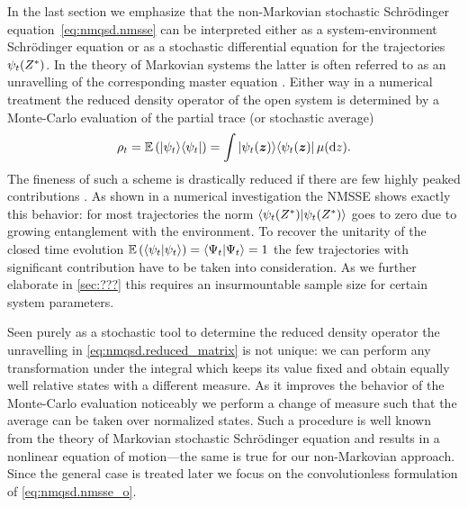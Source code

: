 In the last section we emphasize that the non-Markovian stochastic Schrödinger equation~\ref{eq:nmqsd.nmsse} can be interpreted either as a system-environment Schrödinger equation or as a stochastic differential equation for the trajectories $\psi_t({Z}^*)$.
In the theory of Markovian systems the latter is often referred to as an unravelling of the corresponding master equation \cite{???}.
Either way in a numerical treatment the reduced density operator of the open system is determined by a Monte-Carlo evaluation of the partial trace (or stochastic average)
\begin{equation}
  \rho_t = \E[\ket{\psi_t}\bra{\psi_t}] = \int \ket{\psi_t(\zz)}\bra{\psi_t(\zz)} \mudz.
  \label{eq:nmqsd.reduced_matrix}
\end{equation}
The fineness of such a scheme is drastically reduced if there are few highly peaked contributions \cite{DuSh11_monte_carlo}.
As shown in a numerical investigation \cite{???} the NMSSE shows exactly this behavior: for most trajectories the norm $\langle \psi_t({Z}^*) | \psi_t({Z}^*) \rangle$ goes to zero due to growing entanglement with the environment.
To recover the unitarity of the closed time evolution $\E[\braket{\psi_t}{\psi_t}] = \braket{\Psi_t}{\Psi_t} = 1$ the few trajectories with significant contribution have to be taken into consideration.
As we further elaborate in \autoref{sec:???} this requires an insurmountable sample size for certain system parameters.

Seen purely as a stochastic tool to determine the reduced density operator the unravelling in \autoref{eq:nmqsd.reduced_matrix} is not unique:
we can perform any transformation under the integral which keeps its value fixed and obtain equally well relative states with a different measure.
As it improves the behavior of the Monte-Carlo evaluation noticeably we perform a change of measure such that the average can be taken over normalized states.
Such a procedure is well known from the theory of Markovian stochastic Schrödinger equation \cite{???} and results in a nonlinear equation of motion---the same is true for our non-Markovian approach.
Since the general case is treated later we focus on the convolutionless formulation of \autoref{eq:nmqsd.nmsse_o}.


